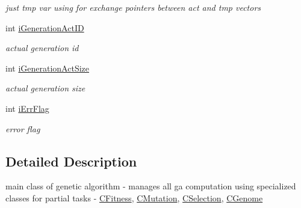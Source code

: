 \begin{DoxyCompactItemize}
\begin{DoxyCompactList}\small\item\em just tmp var using for exchange pointers between act and tmp vectors \item\end{DoxyCompactList}\item 
\hypertarget{classCGeneticAlgorithm_a18bc91f86647208718a7f238d4b1dad3}{
int \hyperlink{classCGeneticAlgorithm_a18bc91f86647208718a7f238d4b1dad3}{iGenerationActID}}
\label{classCGeneticAlgorithm_a18bc91f86647208718a7f238d4b1dad3}

\begin{DoxyCompactList}\small\item\em actual generation id \item\end{DoxyCompactList}\item 
\hypertarget{classCGeneticAlgorithm_a31bf79e643ef4ae9d2258a87cbf11fb4}{
int \hyperlink{classCGeneticAlgorithm_a31bf79e643ef4ae9d2258a87cbf11fb4}{iGenerationActSize}}
\label{classCGeneticAlgorithm_a31bf79e643ef4ae9d2258a87cbf11fb4}

\begin{DoxyCompactList}\small\item\em actual generation size \item\end{DoxyCompactList}\item 
\hypertarget{classCGeneticAlgorithm_a3e7f57114d0d0e51d7ba2bc053fb73a2}{
int \hyperlink{classCGeneticAlgorithm_a3e7f57114d0d0e51d7ba2bc053fb73a2}{iErrFlag}}
\label{classCGeneticAlgorithm_a3e7f57114d0d0e51d7ba2bc053fb73a2}

\begin{DoxyCompactList}\small\item\em error flag \item\end{DoxyCompactList}\end{DoxyCompactItemize}


\subsection{Detailed Description}
main class of genetic algorithm -\/ manages all ga computation using specialized classes for partial tasks -\/ \hyperlink{classCFitness}{CFitness}, \hyperlink{classCMutation}{CMutation}, \hyperlink{classCSelection}{CSelection}, \hyperlink{classCGenome}{CGenome} 

